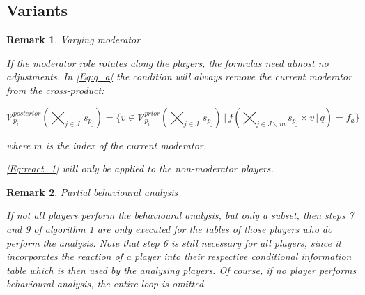 \documentclass{article}
\newtheorem{remark}{Remark}[section]
\begin{document}
\subsection{Variants}

\begin{remark} Varying moderator

If the moderator role rotates along the players, the formulas need almost no adjustments. In \cref{Eq:q_a} the condition will always remove the current moderator from the cross-product:

\begin{equation}
\mathcal{V}_{p_i}^{posterior}(\bigtimes_{j \in J} \, s_{p_j}) = \{ v \in \mathcal{V}_{p_i}^{prior}(\bigtimes_{j \in J} \, s_{p_j}) \, | \, f(\bigtimes_{j \in J \backslash \, m} s_{p_j} \times v \, | \, q) = f_a \}
\end{equation}

where $m$ is the index of the current moderator.

\cref{Eq:react_1} will only be applied to the non-moderator players.

\end{remark}

\begin{remark} Partial behavioural analysis

If not all players perform the behavioural analysis, but only a subset, then steps 7 and 9 of algorithm 1 are only executed for the tables of those players who do perform the analysis. Note that step 6 is still necessary for all players, since it incorporates the reaction of a player into their respective conditional information table which is then used by the analysing players. Of course, if no player performs behavioural analysis, the entire loop is omitted. 

\end{remark}
\end{document}

